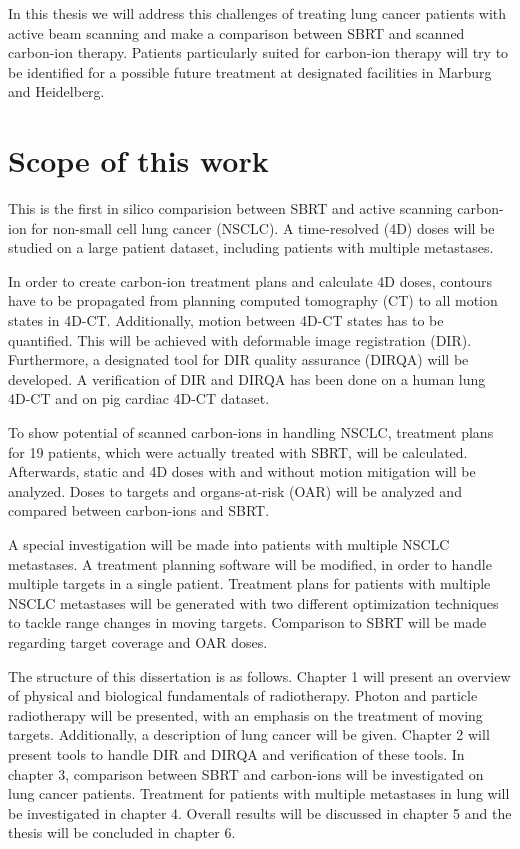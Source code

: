 In this thesis we will address this challenges of treating lung cancer patients with active beam scanning and 
make a comparison between SBRT and scanned carbon-ion therapy. Patients particularly suited for carbon-ion therapy will try to be identified for a possible future treatment at designated facilities in Marburg and Heidelberg. 



\newpage

\section*{Scope of this work}

This is the first in silico comparision between SBRT and active scanning carbon-ion for non-small cell lung cancer (NSCLC). A time-resolved (4D) doses will be studied on a large patient dataset, including patients with multiple metastases.

In order to create carbon-ion treatment plans and calculate 4D doses, contours have to be propagated from planning computed tomography (CT) to all motion states in 4D-CT. Additionally, motion between 4D-CT states has to be quantified. 
This will be achieved with deformable image registration (DIR). 
Furthermore, a designated tool for DIR quality assurance (DIRQA) will be developed. A verification of DIR and DIRQA has been done on a human lung 4D-CT and on pig cardiac 4D-CT dataset.

To show potential of scanned carbon-ions in handling NSCLC, treatment plans for 19 patients, which were actually treated with SBRT, will be calculated. Afterwards, static and 4D doses with and without motion
mitigation will be analyzed. Doses to targets and organs-at-risk (OAR) will be analyzed and compared between carbon-ions and SBRT.

A special investigation will be made into patients with multiple NSCLC metastases. A treatment planning software will be modified, in order to handle multiple targets in a single patient. 
Treatment plans for patients with multiple NSCLC metastases will be generated with two different optimization techniques to tackle range changes in moving targets. Comparison to SBRT will be made regarding target coverage and OAR doses.

The structure of this dissertation is as follows. Chapter 1 will present an overview of physical and biological fundamentals of radiotherapy. Photon and particle radiotherapy will be presented, with an emphasis on the treatment of moving targets.
Additionally, a description of lung cancer will be given. Chapter 2 will present tools to handle DIR and DIRQA and verification of these tools. In chapter 3, comparison between SBRT and carbon-ions will be investigated on lung cancer patients.
Treatment for patients with multiple metastases in lung will be investigated in chapter 4. Overall results will be discussed in chapter 5 and the thesis will be concluded in chapter 6.



